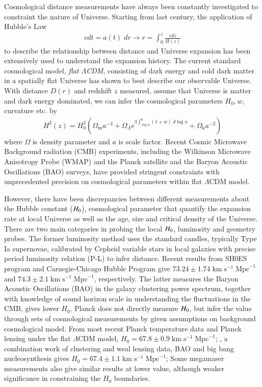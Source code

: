 \documentclass{cosmo}
\begin{document}
    Cosmological distance measurements have always been constantly investigated to constraint the nature of Universe. Starting from last century, the application of Hubble's Law 
    \begin{align*}
        c dt = a(t) \;dr \longrightarrow
    r = \int_0^z \frac{c dz}{H(z)}
    \end{align*}to describe the relationship between distance and Universe expansion has been extensively used to understand the expansion history. The current standard cosmological model, \emph{flat $\Lambda$CDM}, consisting of dark energy and cold dark matter in a spatially flat Universe has shown to best describe our observable Universe. With distance $D(r)$ and redshift $z$ measured, assume that Universe is matter and dark energy dominated, we can infer the cosmological parameters $H_\mathrm{0}, w$, curvature etc. by 
    \begin{align*}
        H^2 (z) = H_0^2 \left(\Omega_\mathrm{m} a^{-3}+\Omega_{\Lambda} e^{3 \int_{\log{a}}^0 (1+w)\;d\log{a}}+\Omega_\mathrm{k}a^{-2}\right)
    \end{align*}
    where $\Omega$ is density parameter and $a$ is scale factor. Recent Cosmic Microwave Background radiation (CMB) experiments, including the Wilkinson Microwave Anisotropy Probe (WMAP) and the Planck satellite and the Baryon Acoustic Oscillations (BAO) surveys, have provided stringent constraints with unprecedented precision on cosmological parameters within flat $\Lambda$CDM model.
    
    However, there have been discrepancies between different measurements about the Hubble constant ($H_{\rm{0}}$), cosmological parameter that quantify the expansion rate at local Universe as well as the age, size and critical density of the Universe. 
    There are two main categories in probing the local $H_{\rm{0}}$, luminosity and geometry probes. 
    The former luminosity method uses the standard candles, typically Type Ia supernovae, calibrated by Cepheid variable stars in local galaxies with precise period luminosity relation (P-L) to infer distance. Recent results from SH0ES program \citep{Riess2016} and Carnegie-Chicago Hubble Program \citep{Beaton2016} give $73.24 \pm 1.74 \;\mathrm{km\; s^{-1} \; {Mpc}^{-1}}$ and  $74.3 \pm 2.1 \;\mathrm{km\; s^{-1} \; {Mpc}^{-1}}$, respectively. 
    The latter measures the Baryon Acoustic Oscillations (BAO) in the galaxy clustering power spectrum, together with knowledge of sound horizon scale in understanding the fluctuations in the CMB, gives lower $H_\mathrm{0}$. Planck does not directly measure $H_{\rm{0}}$, but infer the value through sets of cosmological measurements by given assumptions on background cosmological model. From most recent Planck temperature data and Planck lensing under the flat $\Lambda$CDM model, $H_\mathrm{0}=67.8 \pm 0.9 \;\mathrm{km\; s^{-1} \; {Mpc}^{-1}}$; \cite{Abbott2018}, a combination work of clustering and weal lensing data, BAO and big bang nucleosynthesis gives $H_\mathrm{0}=67.4 \pm 1.1 \;\mathrm{km\; s^{-1} \; {Mpc}^{-1}}$; Some megamaser measurements also give similar results at lower value, although weaker significance in constraining the $H_\mathrm{0}$ boundaries.
    
\end{document}
